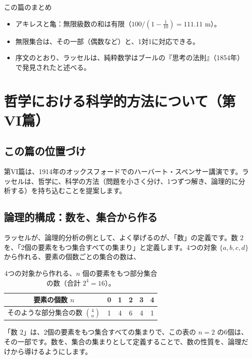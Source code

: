 \documentclass[a4paper,11pt,openany]{ltjsbook}
\begin{document}
\begin{pointbox}{この篇のまとめ}
\begin{itemize}[leftmargin=*]
\item アキレスと亀：無限級数の和は有限（$100/(1-\tfrac1{10})=111.11$ m）。
\item 無限集合は、その一部（偶数など）と、1対1に対応できる。
\item 序文のとおり、ラッセルは、純粋数学はブールの『思考の法則』（1854年）で発見されたと述べる。
\end{itemize}
\end{pointbox}

\chapter{哲学における科学的方法について（第VI篇）}

\section{この篇の位置づけ}

第VI篇は、1914年のオックスフォードでのハーバート・スペンサー講演です。ラッセルは、哲学に、科学の方法（問題を小さく分け、1つずつ解き、論理的に分析する）を持ち込むことを提案します。

\section{論理的構成：数を、集合から作る}

ラッセルが、論理的分析の例として、よく挙げるのが、「数」の定義です。数 $2$ を、「2個の要素をもつ集合すべての集まり」と定義します。4つの対象 $\{a,b,c,d\}$ から作れる、要素の個数ごとの集合の数は、

\begin{table}[htbp]
\centering
\begin{tabular}{c|ccccc}
\toprule
要素の個数 $n$ & 0 & 1 & 2 & 3 & 4\\
\midrule
そのような部分集合の数 $\binom4n$ & 1 & 4 & 6 & 4 & 1\\
\bottomrule
\end{tabular}
\caption{4つの対象から作れる、$n$ 個の要素をもつ部分集合の数（合計 $2^4=16$）。}
\end{table}

「数 $2$」は、2個の要素をもつ集合すべての集まりで、この表の $n=2$ の6個は、その一部です。数を、集合の集まりとして定義することで、数の性質を、論理だけから導けるようにします。
\end{document}
